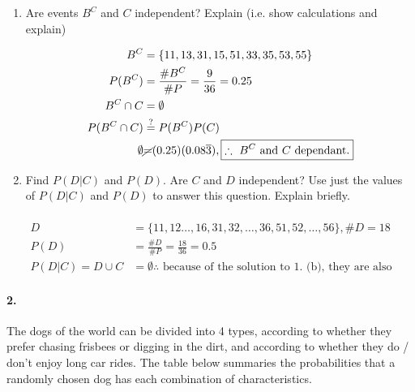 \begin{enumerate}[label=(\alph*)]
        \pagebreak

        \item Are events $B^C$ and $C$ independent? Explain (i.e. show calculations and explain)
        
        \begin{mdframed}
            \begin{align*}
                B^C & = \{11,13,31,15,51,33,35,53,55\}  \\
                P(B^C) & = \frac{\#B^C}{\#P} = \frac{9}{36} = 0.25  \\
                B^C \cap C & = \emptyset   \\
                P(B^C \cap C) & \stackrel{?}{=} P(B^C)P(C)    \\
                \emptyset & \cancel{=} (0.25)(0.08\overline{3}), \boxed{\therefore \text{ $B^C$ and $C$ dependant.}}
            \end{align*}
        \end{mdframed}

        \item Find $P(D|C)$ and $P(D)$. Are $C$ and $D$ independent? Use just the values of
        $P(D|C)$ and $P(D)$ to answer this question. Explain briefly.

        \begin{mdframed}
            \begin{align*}                            \\
                D & = \{11,12\dots,16,31,32,\dots,36,51,52,\dots,56\}, \#D = 18     \\
                P(D) & = \frac{\#D}{\#P} = \frac{18}{36} = \boxed{0.5}              \\
                P(D|C) = D \cup C & = \boxed{\emptyset \therefore \text{ because of the solution to 1. (b), they are also independent.}}
            \end{align*}
        \end{mdframed}
    \end{enumerate}

    \paragraph*{2.}
    The dogs of the world can be divided into 4 types, according to whether they prefer chasing frisbees or digging in the dirt, and according to whether they do / don't enjoy long car rides. The table below summaries the probabilities that a randomly chosen dog has each combination of characteristics.

